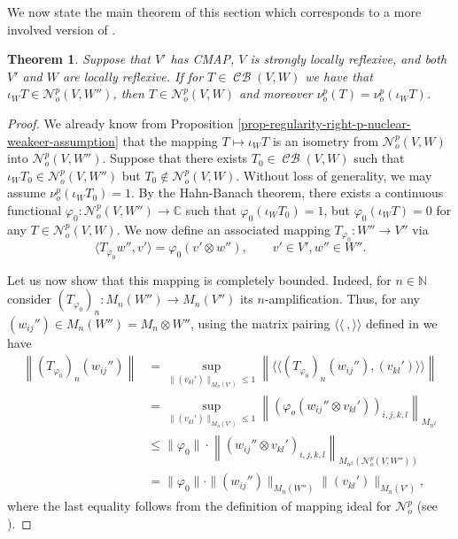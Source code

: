 \documentclass[11pt]{amsart}
\DeclareMathOperator{\CB}{\mathcal{CB}}
\newcommand{\C}{{\mathbb{C}}}
\newcommand{\pair}[2]{{\langle #1, #2 \rangle}}
\newtheorem{theorem}{Theorem}[section]
\numberwithin{equation}{section}
\begin{document}
We now state the main theorem of this section which corresponds to a more involved version of \cite[Lem. 3]{Pietsch-p-compact}.

\begin{theorem}\label{theorem-Pietsch}
Suppose that $V'$ has CMAP, $V$ is strongly locally reflexive, and both $V'$ and $W$ are locally reflexive.
If for $T\in\CB(V,W)$ we have that $\iota_WT \in \mathcal{N}^p_o(V,W'')$, then $T\in \mathcal{N}^p_o(V,W)$ and moreover $\nu^p_o(T) = \nu^p_o(\iota_WT)$.
\end{theorem}

\begin{proof}
We already know from Proposition \ref{prop-regularity-right-p-nuclear-weakeer-assumption} that the mapping $T \mapsto \iota_W T$ is an isometry from 
$\mathcal{N}^p_o(V,W)$ into $\mathcal{N}^p_o(V,W'')$. 
Suppose that there exists $T_0 \in \CB(V,W)$ such that $\iota_WT_0 \in \mathcal{N}^p_o(V,W'')$ but $T_0\not\in \mathcal{N}^p_o(V,W)$.
Without loss of generality, we may assume $\nu^p_o(\iota_WT_0) = 1$.
By the Hahn-Banach theorem, there exists a continuous functional $\varphi_0 : \mathcal{N}^p_o(V,W'') \to \C$ such that $\varphi_0( \iota_WT_0  ) = 1$, but $\varphi_0( \iota_WT  )=0$ for any $T \in \mathcal{N}^p_o(V,W)$.
We now define an associated mapping $T_{\varphi_0} : W'' \to V''$ via
\[
\pair{T_{\varphi_0} w''}{v'} =  \varphi_0( v' \otimes w'' ), \qquad v' \in V', w'' \in W''.
\]

Let us now show that this mapping is completely bounded. Indeed, for $n\in \mathbb{N}$ consider
$(T_{\varphi_0})_n: M_n(W'') \to M_n(V'')$ its $n$-amplification.
Thus, for any $(w_{ij}'') \in M_n(W'') = M_n \otimes W''$, using the matrix pairing $\langle\langle\ , \rangle\rangle$  defined in  \cite[(1.1.27)]{Effros-Ruan-book} we have
\begin{align*}
\left\| (T_{\varphi_0})_n (w_{ij}'')\right\| & = \sup_{\|(v_{kl}')\|_{M_n(V')}\le 1}  \left\|  \langle\langle (T_{\varphi_0})_n (w_{ij}''), (v_{kl}') \rangle\rangle\right\|\\
& = \sup_{\|(v_{kl}')\|_{M_n(V')}\le 1}  \left\| \left(\varphi_o(w_{ij}'' \otimes v_{kl}')\right)_{i,j,k,l}\right\|_{M_{n^2}} \\
& \le \|\varphi_0\| \cdot \left\| \left(w_{ij}'' \otimes v_{kl}'\right)_{i,j,k,l}\right\|_{M_{n^2}(\mathcal{N}^p_o(V,W''))} \\
& = \|\varphi_0\| \cdot \| (w_{ij}'')\|_{M_n(W'')} \|(v_{kl}')\|_{M_n(V')},
\end{align*}
where the last equality follows from the definition of mapping ideal for $\mathcal{N}^p_o$ (see \cite[Def. 7.1. (b) and Rmk. 7.2 (vii)]{ChaDiGa-tensor-norms}). 




\end{proof}
\end{document}
